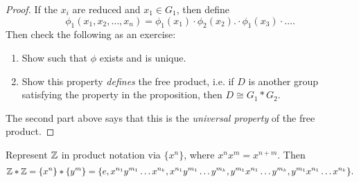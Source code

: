 \begin{proof}
  If the $x_i$ are reduced and $x_1 \in G_1$, then define
  \[
    \phi_1(x_1, x_2, \dots, x_n) = \phi_1(x_1) \cdot \phi_2(x_2) .\cdot \phi_1(x_3) \cdot \dots.
  \]
  Then check the following as an exercise:
  \begin{enumerate}
    \item Show such that $\phi$ exists and is unique.
    \item Show this property \emph{defines} the
      free product, i.e. if $D$ is another group
      satisfying the property in the proposition, then
      $D \cong G_1 * G_2$.
  \end{enumerate}
  The second part above says that this is
  the \emph{universal property} of the free product.
\end{proof}

\begin{example}
  Represent $\mathbb{Z}$ in product notation via $\{x^n\}$, where
  $x^n x^m = x^{n + m}$. Then
  \[
    \mathbb{Z} * \mathbb{Z} = \{x^n\} * \{y^m\}
    = \{e,
      x^{n_1} y^{m_1} \dots x^{n_k},
      x^{n_1} y^{m_1} \dots y^{m_k},
      y^{m_1} x^{n_1} \dots y^{m_k},
      y^{m_1} x^{n_1} \dots x^{n_k}
    \}.
  \]
\end{example}

